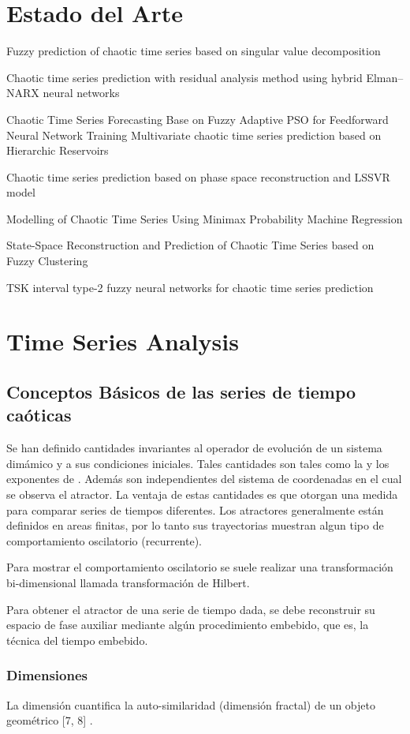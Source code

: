 \documentclass[12pt]{book}
\begin{document}
\chapter{Estado del Arte}
Fuzzy prediction of chaotic time series based on singular value decomposition

Chaotic time series prediction with residual analysis method using hybrid
Elman–NARX neural networks

Chaotic Time Series Forecasting Base on Fuzzy Adaptive PSO for Feedforward Neural Network Training 
Multivariate chaotic time series prediction based on Hierarchic Reservoirs 

Chaotic time series prediction based on phase space reconstruction and LSSVR
model 

Modelling of Chaotic Time Series Using Minimax Probability Machine
Regression

State-Space Reconstruction and Prediction of Chaotic Time Series based on Fuzzy
Clustering

TSK interval type-2 fuzzy neural networks for chaotic time series prediction 

\chapter{Time Series Analysis}
\section{Conceptos Básicos de las series de tiempo caóticas}
Se han definido cantidades invariantes al operador de evolución de un sistema
dimámico y a sus condiciones iniciales. Tales cantidades son tales como la
 y los exponentes de . Además son independientes del
sistema de coordenadas en el cual se observa el atractor. 
La ventaja de estas cantidades es que otorgan una medida para comparar series de
tiempos diferentes. %
Los atractores generalmente están definidos en areas finitas, por lo tanto sus
trayectorias muestran algun tipo de comportamiento oscilatorio (recurrente).

Para mostrar el comportamiento oscilatorio se suele realizar una transformación
bi-dimensional llamada transformación de Hilbert. 

Para obtener el atractor de una serie de tiempo dada, se debe reconstruir su
espacio de fase auxiliar mediante algún procedimiento embebido, que es, la
técnica del tiempo embebido.


\subsection{Dimensiones}
La dimensión cuantifica la auto-similaridad (dimensión fractal) de un objeto
geométrico [7, 8] .
\end{document}
